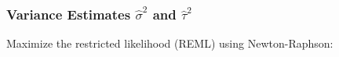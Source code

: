 \documentclass[final]{beamer}
\begin{document}
\begin{frame}
\frametitle{Variance Estimates $\hat{\sigma}^2$ and $\hat{\tau}^2$}

Maximize the restricted likelihood (REML) using Newton-Raphson:
\begin{center}
\end{center}
\end{frame}
\end{document}

